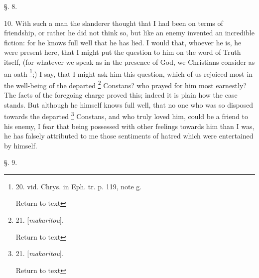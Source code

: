 §. 8.

10. With such a man the slanderer thought that I had been on terms of
friendship, or rather he did not think so, but like an enemy invented
an incredible fiction: for he knows full well that he has lied. I
would that, whoever he is, he were present here, that I might put the
question to him on the word of Truth itself, (for whatever we speak as
in the presence of God, we Christians consider as an oath \footnote{20. vid. Chrys. in Eph. tr. p. 119, note g.

Return to text};) I say, that I might ask him this question, which of us
rejoiced most in the well-being of the departed \footnote{21. [\emph{makaritou}].

Return to text} Constans? who prayed for him most earnestly? The facts of the
foregoing charge proved this; indeed it is plain how the case stands.
But although he himself knows full well, that no one who was so
disposed towards the departed \footnote{21. [\emph{makaritou}].

Return to text}
Constans, and who truly loved him, could be a friend to his enemy, I
fear that being possessed with other feelings towards him than I
was, he has falsely attributed to me those sentiments of hatred which
were entertained by himself.

§. 9.

